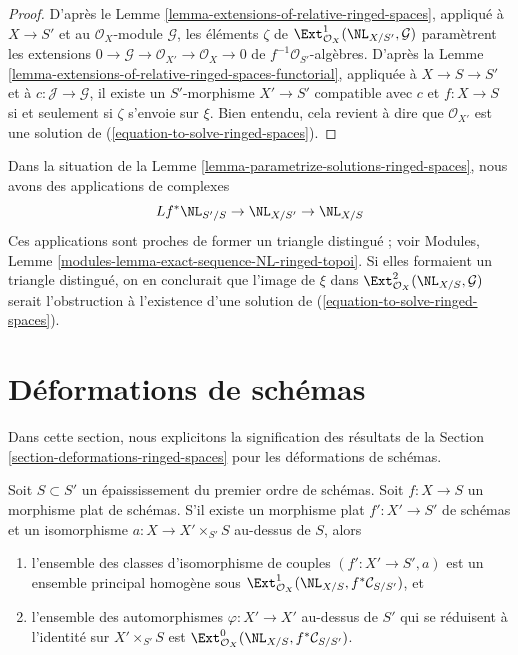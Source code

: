 \begin{proof}
D'après le Lemme \ref{lemma-extensions-of-relative-ringed-spaces}, appliqué
à $X \to S'$ et au $\mathcal{O}_X$-module $\mathcal{G}$, les éléments
$\zeta$ de
$\Ext^1_{\mathcal{O}_X}(\NL_{X/S'}, \mathcal{G})$
paramètrent les extensions
$0 \to \mathcal{G} \to \mathcal{O}_{X'} \to \mathcal{O}_X \to 0$
de $f^{-1}\mathcal{O}_{S'}$-algèbres.
D'après la
Lemme \ref{lemma-extensions-of-relative-ringed-spaces-functorial}, appliquée
à $X \to S \to S'$ et à $c : \mathcal{J} \to \mathcal{G}$, il existe un
$S'$-morphisme $X' \to S'$ compatible avec $c$ et
$f : X \to S$ si et seulement si $\zeta$ s'envoie sur $\xi$.
Bien entendu, cela revient à dire que $\mathcal{O}_{X'}$ est une solution de
(\ref{equation-to-solve-ringed-spaces}).
\end{proof}

\begin{remark}
\label{remark-parametrize-solutions-ringed-spaces}
Dans la situation de la
Lemme \ref{lemma-parametrize-solutions-ringed-spaces}, nous avons des
applications de complexes
$$
Lf^*\NL_{S'/S} \to \NL_{X/S'} \to \NL_{X/S}
$$
Ces applications sont proches de former un triangle distingué ; voir
Modules, Lemme \ref{modules-lemma-exact-sequence-NL-ringed-topoi}.
Si elles formaient un triangle distingué, on en conclurait que l'image de
$\xi$ dans $\Ext^2_{\mathcal{O}_X}(\NL_{X/S}, \mathcal{G})$
serait l'obstruction à l'existence d'une solution de
(\ref{equation-to-solve-ringed-spaces}).
\end{remark}

\section{Déformations de schémas}
\label{section-deformations-schemes}

\noindent
Dans cette section, nous explicitons la signification des résultats de la
Section \ref{section-deformations-ringed-spaces} pour les déformations de
schémas.

\begin{lemma}
\label{lemma-deform}
Soit $S \subset S'$ un épaississement du premier ordre de schémas.
Soit $f : X \to S$ un morphisme plat de schémas.
S'il existe un morphisme plat $f' : X' \to S'$ de schémas et un isomorphisme
$a : X \to X' \times_{S'} S$ au-dessus de $S$, alors
\begin{enumerate}
\item l'ensemble des classes d'isomorphisme de couples
$(f' : X' \to S', a)$ est un ensemble principal homogène sous
$\Ext^1_{\mathcal{O}_X}(\NL_{X/S}, f^*\mathcal{C}_{S/S'})$, et
\item l'ensemble des automorphismes $\varphi : X' \to X'$ au-dessus de $S'$
qui se réduisent à l'identité sur $X' \times_{S'} S$ est
$\Ext^0_{\mathcal{O}_X}(\NL_{X/S}, f^*\mathcal{C}_{S/S'})$.
\end{enumerate}
\end{lemma}

